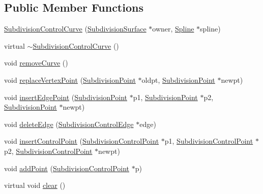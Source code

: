\subsection*{Public Member Functions}
\begin{DoxyCompactItemize}
\item 
\hyperlink{classShipCAD_1_1SubdivisionControlCurve_a6655333ddb8fa6c464dba4f6f7776592}{Subdivision\+Control\+Curve} (\hyperlink{classShipCAD_1_1SubdivisionSurface}{Subdivision\+Surface} $\ast$owner, \hyperlink{classShipCAD_1_1Spline}{Spline} $\ast$spline)
\item 
virtual \hyperlink{classShipCAD_1_1SubdivisionControlCurve_ab8df7be8d521f9b0bc5c7e8fd0156eef}{$\sim$\+Subdivision\+Control\+Curve} ()
\item 
void \hyperlink{classShipCAD_1_1SubdivisionControlCurve_a6e2678c3fa1885e63d11bb692af54af7}{remove\+Curve} ()
\item 
void \hyperlink{classShipCAD_1_1SubdivisionControlCurve_a078fc8820a6c0e37c475eec1897b13dd}{replace\+Vertex\+Point} (\hyperlink{classShipCAD_1_1SubdivisionPoint}{Subdivision\+Point} $\ast$oldpt, \hyperlink{classShipCAD_1_1SubdivisionPoint}{Subdivision\+Point} $\ast$newpt)
\item 
void \hyperlink{classShipCAD_1_1SubdivisionControlCurve_a0764f5d7697b76ac928a121d224733f5}{insert\+Edge\+Point} (\hyperlink{classShipCAD_1_1SubdivisionPoint}{Subdivision\+Point} $\ast$p1, \hyperlink{classShipCAD_1_1SubdivisionPoint}{Subdivision\+Point} $\ast$p2, \hyperlink{classShipCAD_1_1SubdivisionPoint}{Subdivision\+Point} $\ast$newpt)
\item 
void \hyperlink{classShipCAD_1_1SubdivisionControlCurve_abfed48331919c4d2a2bfc6363b28ebb4}{delete\+Edge} (\hyperlink{classShipCAD_1_1SubdivisionControlEdge}{Subdivision\+Control\+Edge} $\ast$edge)
\item 
void \hyperlink{classShipCAD_1_1SubdivisionControlCurve_a9469b178a88269d0f9ee3b17d5f15272}{insert\+Control\+Point} (\hyperlink{classShipCAD_1_1SubdivisionControlPoint}{Subdivision\+Control\+Point} $\ast$p1, \hyperlink{classShipCAD_1_1SubdivisionControlPoint}{Subdivision\+Control\+Point} $\ast$p2, \hyperlink{classShipCAD_1_1SubdivisionControlPoint}{Subdivision\+Control\+Point} $\ast$newpt)
\item 
void \hyperlink{classShipCAD_1_1SubdivisionControlCurve_a1155b0abe401a7128369a589b6e6ac9c}{add\+Point} (\hyperlink{classShipCAD_1_1SubdivisionControlPoint}{Subdivision\+Control\+Point} $\ast$p)
\item 
virtual void \hyperlink{classShipCAD_1_1SubdivisionControlCurve_aa574f77f4abc5a8eef05e7cef7f8d8a2}{clear} ()

\end{DoxyCompactItemize}
